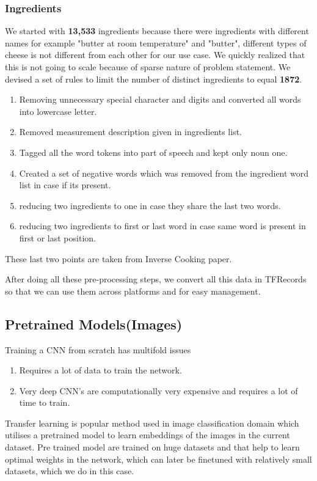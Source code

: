\documentclass{article}
\begin{document}
\subsubsection{Ingredients}

We started with \textbf{13,533} ingredients because there were ingredients with different names for example "butter at room temperature" and "butter", different types of cheese is not different from each other for our use case. We quickly realized that this is not going to scale because of sparse nature of problem statement. We devised a set of rules to limit the number of distinct ingredients to equal \textbf{1872}.
\begin{enumerate}
    \item Removing unnecessary special character and digits and converted all words into lowercase letter.
    \item Removed measurement description given in ingredients list.
    \item Tagged all the word tokens into part of speech and kept only noun one.
    \item Created a set of negative words which was removed from the ingredient word list in case if its present.
    \item reducing two ingredients to one in case they share the last two words.
    \item reducing two ingredients to first or last word in case same word is present in first or last position. 
\end{enumerate}
These last two points are taken from Inverse Cooking paper.

After doing all these pre-processing steps, we convert all this data in TFRecords so that we can use them across platforms and for easy management.

\subsection{Pretrained Models(Images)}
Training a CNN from scratch has multifold issues
\begin{enumerate}
    \item Requires a lot of data to train the network.
    \item Very deep CNN's are computationally  very expensive and requires a lot of time to train.  
\end{enumerate}
Transfer learning is popular method used in image classification domain which utilises a pretrained model to learn embeddings of the images in the current dataset. Pre trained model are trained on huge datasets and that help to learn optimal weights in the network, which can later be finetuned with relatively small datasets, which we do in this case.
\end{document}
